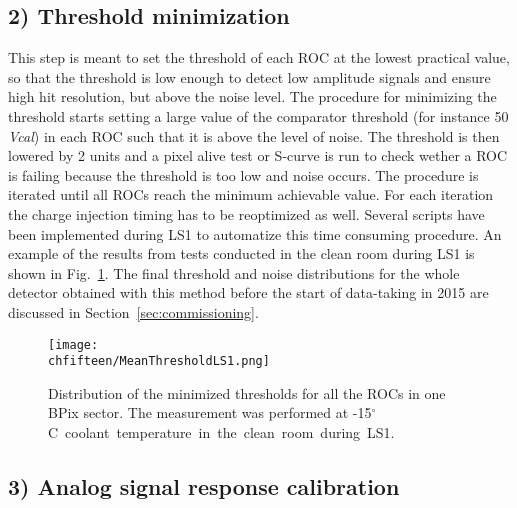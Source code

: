 \subsection*{2) Threshold minimization}

This step is meant to set the threshold of each ROC at the lowest practical value, so that the threshold is low enough to detect low amplitude signals and ensure high hit resolution,
but above the noise level.
The procedure for minimizing the threshold starts setting a large value of the comparator threshold (for instance 50 \textit{Vcal}) in each ROC such that it is above the level of noise.
The threshold is then lowered by 2 units and a pixel alive test or S-curve is run to check wether a ROC is failing because the threshold is too low and noise occurs.
The procedure is iterated until all ROCs reach the minimum achievable value. For each iteration the charge injection timing has to be reoptimized as well.
Several scripts have been implemented during LS1 to automatize this time consuming procedure. An example of the results from tests conducted in the clean room during LS1 is shown in Fig.~\ref{fig:ThrCalibLS1}.
The final threshold and noise distributions for the whole detector obtained with this method before the start of data-taking in 2015 are discussed in Section~\ref{sec:commissioning}.

\begin{figure}[!htb]
\begin{center}
 \texttt{[image: \\chfifteen/MeanThresholdLS1.png]}
 \end{center}
 \caption{Distribution of the minimized thresholds for all the ROCs in one BPix sector. The measurement was performed at -15\unit{$^\circ$C} coolant temperature in the clean room during LS1.}
 \label{fig:ThrCalibLS1}
\end{figure}

\subsection*{3) Analog signal response calibration}

